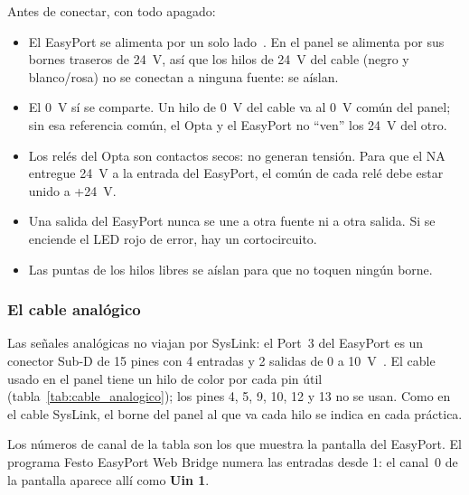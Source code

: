\documentclass[12pt,a4paper]{article}
\newcommand{\ui}[1]{\textcolor{DeepBlue}{\textsf{\textbf{#1}}}}
\begin{document}
\begin{advertencia}
Antes de conectar, con todo apagado:
\begin{itemize}
    \item El EasyPort se alimenta por un solo lado~\cite{easyport}. En el
    panel se alimenta por sus bornes traseros de 24~V, así que los hilos de
    24~V del cable (negro y blanco/rosa) no se conectan a ninguna fuente:
    se aíslan.
    \item El 0~V sí se comparte. Un hilo de 0~V del cable va al 0~V común del
    panel; sin esa referencia común, el Opta y el EasyPort no ``ven'' los
    24~V del otro.
    \item Los relés del Opta son contactos secos: no generan tensión. Para que
    el NA entregue 24~V a la entrada del EasyPort, el común de cada relé debe
    estar unido a +24~V.
    \item Una salida del EasyPort nunca se une a otra fuente ni a otra
    salida. Si se enciende el LED rojo de error, hay un cortocircuito.
    \item Las puntas de los hilos libres se aíslan para que no toquen ningún
    borne.
\end{itemize}
\end{advertencia}

\subsubsection{El cable analógico}
\label{subsubsec:cable_analogico}
Las señales analógicas no viajan por SysLink: el Port~3 del EasyPort es un
conector Sub-D de 15 pines con 4 entradas y 2 salidas de 0 a
10~V~\cite{easyport}. El cable usado en el panel tiene un hilo de color por
cada pin útil (tabla~\ref{tab:cable_analogico}); los pines 4, 5, 9, 10, 12
y 13 no se usan. Como en el cable SysLink, el borne del panel al que va
cada hilo se indica en cada práctica.

Los números de canal de la tabla son los que muestra la pantalla del
EasyPort. El programa Festo EasyPort Web Bridge numera las entradas desde
1: el canal~0 de la pantalla aparece allí como \ui{Uin 1}.
\end{document}
